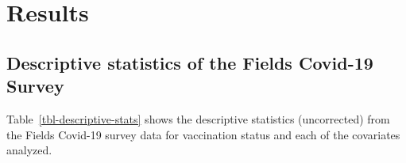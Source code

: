 \documentclass[
  letterpaper,
  DIV=11,
  numbers=noendperiod]{scrartcl}
\begin{document}
\hypertarget{results}{%
\section{Results}\label{results}}

\hypertarget{descriptive-statistics-of-the-fields-covid-19-survey}{%
\subsection{Descriptive statistics of the Fields Covid-19
Survey}\label{descriptive-statistics-of-the-fields-covid-19-survey}}

Table~\ref{tbl-descriptive-stats} shows the descriptive statistics
(uncorrected) from the Fields Covid-19 survey data for vaccination
status and each of the covariates analyzed.
\end{document}
